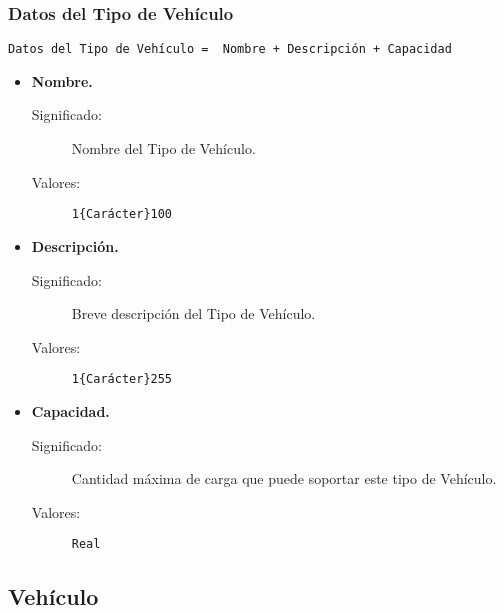 \subsubsection{Datos del Tipo de Vehículo}\label{Datos_Tipo_Vehiculo}
\begin{lstlisting}
Datos del Tipo de Vehículo =  Nombre + Descripción + Capacidad
\end{lstlisting}
	\begin{itemize}
		\item \textbf{Nombre.}
			\begin{description}
				\item [Significado:] Nombre del Tipo de Vehículo.
				\item [Valores:]{\begin{lstlisting}
1{Carácter}100\end{lstlisting}}
			\end{description}
		\item \textbf{Descripción.}
			\begin{description}
				\item [Significado:] Breve descripción del Tipo de Vehículo.
				\item [Valores:]{\begin{lstlisting}
1{Carácter}255\end{lstlisting}}
			\end{description}
		\item \textbf{Capacidad.}
			\begin{description}
				\item [Significado:] Cantidad máxima de carga que puede soportar este tipo de Vehículo.
				\item [Valores:]{\begin{lstlisting}
Real\end{lstlisting}}
			\end{description}
	\end{itemize}

\subsection{Vehículo}

